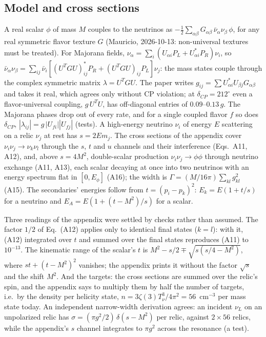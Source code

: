 \documentclass[11pt,a4paper]{article}
\begin{document}
\subsection{Model and cross sections}
\label{sec:si_model}

A real scalar $\phi$ of mass $M$ couples to the neutrinos as
$-\tfrac12\sum_{\alpha\beta}G_{\alpha\beta}\,\bar\nu_\alpha\nu_\beta\,\phi$, for any real symmetric
flavor texture $G$ (Mauricio, 2026-10-13: non-universal textures must be treated). For Majorana
fields, $\nu_\alpha = \sum_i(U_{\alpha i}P_L + U^*_{\alpha i}P_R)\nu_i$, so
$\bar\nu_\alpha\nu_\beta = \sum_{ij}\bar\nu_i[(U^TGU)^*_{ij}P_R + (U^TGU)_{ij}P_L]\nu_j$: the mass
states couple through the complex symmetric matrix $\lambda = U^TGU$. The paper writes
$g_{ij} = \sum U^*_{\alpha i}U_{\beta j}G_{\alpha\beta}$ and takes it real, which agrees only
without CP violation; at $\delta_{CP} = 212^\circ$ even a flavor-universal coupling, $g\,U^TU$, has
off-diagonal entries of $0.09$--$0.13\,g$. The Majorana phases drop out of every rate, and for a
single coupled flavor $f$ so does $\delta_{CP}$, $|\lambda_{ij}| = g\,|U_{fi}||U_{fj}|$ (tests).
A high-energy neutrino $\nu_i$ of energy $E$ scattering on a relic $\nu_j$ at rest has
$s = 2Em_j$. The cross sections of the appendix cover $\nu_i\nu_j\to\nu_k\nu_l$ through the $s$,
$t$ and $u$ channels and their interference (Eqs.~A11, A12), and, above $s = 4M^2$, double-scalar
production $\nu_i\nu_j\to\phi\phi$ through neutrino exchange (A11, A13), each scalar decaying at
once into two neutrinos with an energy spectrum flat in $[0, E_\phi]$ (A16); the width is
$\Gamma = (M/16\pi)\sum_{kl}g_{kl}^2$ (A15). The secondaries' energies follow from
$t = (p_i - p_k)^2$: $E_k = E(1 + t/s)$ for a neutrino and $E_A = E(1 + (t-M^2)/s)$ for a scalar.

Three readings of the appendix were settled by checks rather than assumed. The factor $1/2$ of
Eq.~(A12) applies only to identical final states ($k = l$): with it, (A12) integrated over $t$ and
summed over the final states reproduces (A11) to $10^{-13}$. The kinematic range of the scalar's
$t$ is $M^2 - s/2\mp\sqrt{s(s/4 - M^2)}$, where $st + (t - M^2)^2$ vanishes; the appendix prints
it without the factor $\sqrt s$ and the shift $M^2$. And the targets: the cross sections are summed
over the relic's spin, and the appendix says to multiply them by half the number of targets, i.e.\
by the density per helicity state, $n = 3\zeta(3)T_\nu^3/4\pi^2 = 56$~cm$^{-3}$ per mass state
today. An independent narrow-width derivation agrees: an incident $\nu_L$ on an unpolarized relic
has $\sigma = (\pi g^2/2)\,\delta(s - M^2)$ per relic, against $2\times56$ relics, while the
appendix's $s$ channel integrates to $\pi g^2$ across the resonance (a test).
\end{document}
